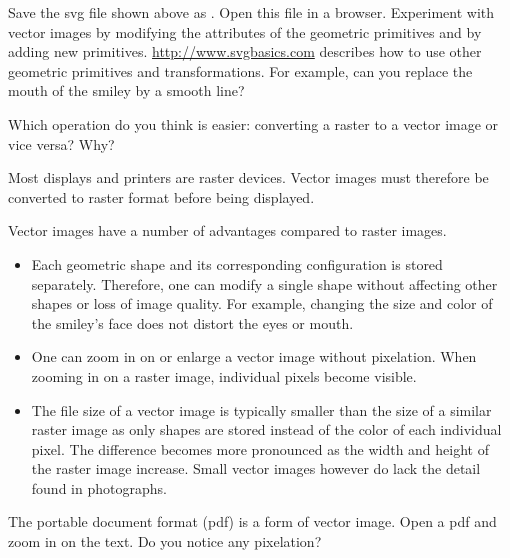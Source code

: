 \documentclass{book}
\begin{document}
\begin{exercise}
Save the svg file shown above as . Open this file in a browser. Experiment with vector images by modifying the attributes of the geometric primitives and by adding new primitives. \href{http://www.svgbasics.com}{http://www.svgbasics.com} describes how to use other geometric primitives and transformations. For example, can you replace the mouth of the smiley by a smooth line?
\end{exercise}

\begin{exercise}
Which operation do you think is easier: converting a raster to a vector image or vice versa? Why?
\end{exercise}

Most displays and printers are raster devices. Vector images must therefore be converted to raster format before being displayed. 

Vector images have a number of advantages compared to raster images. 
\begin{itemize}
  \item Each geometric shape and its corresponding configuration is stored separately. Therefore, one can  modify a single shape without affecting other shapes or loss of image quality. For example, changing the size and color of the smiley's face does not distort the eyes or mouth.
  \item One can zoom in on or enlarge a vector image without pixelation. When zooming in on a raster image, individual pixels become visible.
  \item The file size of a vector image is typically smaller than the size of a similar raster image as only shapes are stored instead of the color of each individual pixel. The difference becomes more pronounced as the width and height of the raster image increase. Small vector images however do lack the detail found in photographs.
\end{itemize}

\begin{exercise}
The portable document format (pdf) is a form of vector image. Open a pdf and zoom in on the text. Do you notice any pixelation?
\end{exercise}

\end{document}
